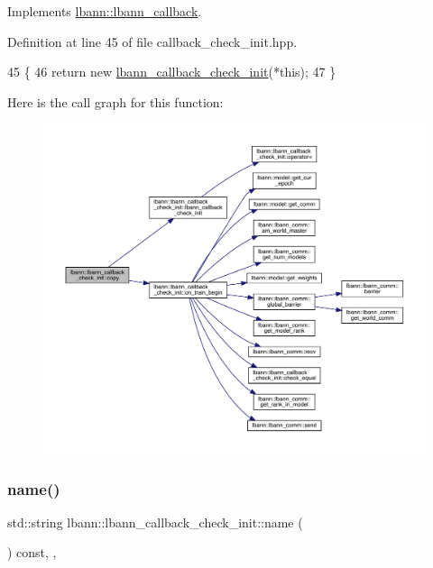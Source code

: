 Implements \hyperlink{classlbann_1_1lbann__callback_a9f545d1269a8c7af335625d049691f26}{lbann\+::lbann\+\_\+callback}.



Definition at line 45 of file callback\+\_\+check\+\_\+init.\+hpp.


\begin{DoxyCode}
45                                                    \{
46     \textcolor{keywordflow}{return} \textcolor{keyword}{new} \hyperlink{classlbann_1_1lbann__callback__check__init_a3910da2c4e972567d79e5e414404a3da}{lbann\_callback\_check\_init}(*\textcolor{keyword}{this});
47   \}
\end{DoxyCode}
Here is the call graph for this function\+:\nopagebreak
\begin{figure}[H]
\begin{center}
\leavevmode
\includegraphics[width=350pt]{classlbann_1_1lbann__callback__check__init_aa210192427df3f6aa7e12509e9b57f56_cgraph}
\end{center}
\end{figure}
\mbox{\label{classlbann_1_1lbann__callback__check__init_a4f8507c26f8e467697fef29ab8463b0f}} 
\subsubsection{\texorpdfstring{name()}{name()}}
{\footnotesize\ttfamily std\+::string lbann\+::lbann\+\_\+callback\+\_\+check\+\_\+init\+::name (\begin{DoxyParamCaption}{ }\end{DoxyParamCaption}) const\hspace{0.3cm}{\ttfamily [inline]}, {\ttfamily [override]}, {\ttfamily [virtual]}}

